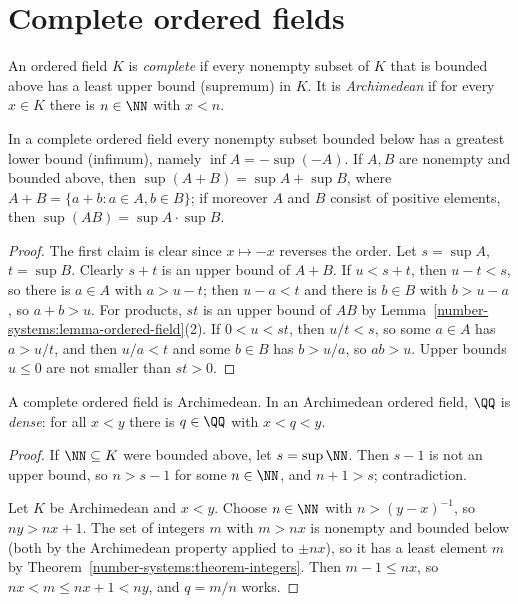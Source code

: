 \section{Complete ordered fields}\label{number-systems:section-complete-ordered-fields}

\begin{definition}\label{number-systems:definition-complete}
An ordered field $K$ is \emph{complete} if every nonempty subset of $K$ that is
bounded above has a least upper bound (supremum) in $K$. It is
\emph{Archimedean} if for every $x \in K$ there is $n \in \NN$ with $x < n$.
\end{definition}

\begin{lemma}\label{number-systems:lemma-sup-inf}
In a complete ordered field every nonempty subset bounded below has a greatest
lower bound (infimum), namely $\inf A = -\sup(-A)$. If $A, B$ are nonempty and
bounded above, then $\sup(A + B) = \sup A + \sup B$, where
$A + B = \{a + b : a \in A, b \in B\}$; if moreover $A$ and $B$ consist of positive
elements, then $\sup(AB) = \sup A \cdot \sup B$.
\end{lemma}

\begin{proof}
The first claim is clear since $x \mapsto -x$ reverses the order. Let
$s = \sup A$, $t = \sup B$. Clearly $s + t$ is an upper bound of $A + B$. If
$u < s + t$, then $u - t < s$, so there is $a \in A$ with $a > u - t$; then
$u - a < t$ and there is $b \in B$ with $b > u - a$, so $a + b > u$. For products,
$st$ is an upper bound of $AB$ by Lemma~\ref{number-systems:lemma-ordered-field}(2).
If $0 < u < st$, then $u/t < s$, so some $a \in A$ has $a > u/t$, and then
$u/a < t$ and some $b \in B$ has $b > u/a$, so $ab > u$. Upper bounds $u \leq 0$
are not smaller than $st > 0$.
\end{proof}

\begin{proposition}\label{number-systems:proposition-complete-archimedean}
A complete ordered field is Archimedean. In an Archimedean ordered field,
$\QQ$ is \emph{dense}: for all $x < y$ there is $q \in \QQ$ with $x < q < y$.
\end{proposition}

\begin{proof}
If $\NN \subseteq K$ were bounded above, let $s = \sup \NN$. Then $s - 1$ is not an
upper bound, so $n > s - 1$ for some $n \in \NN$, and $n + 1 > s$; contradiction.

Let $K$ be Archimedean and $x < y$. Choose $n \in \NN$ with $n > (y - x)^{-1}$, so
$ny > nx + 1$. The set of integers $m$ with $m > nx$ is nonempty and bounded below
(both by the Archimedean property applied to $\pm nx$), so it has a least
element $m$ by Theorem~\ref{number-systems:theorem-integers}. Then
$m - 1 \leq nx$, so $nx < m \leq nx + 1 < ny$, and $q = m/n$ works.
\end{proof}

